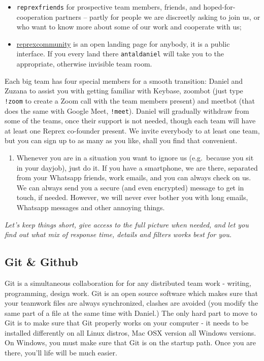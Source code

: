 \documentclass[
  a4paper,
  openany, a4paper, oneside]{book}
\providecommand{\tightlist}{%
  \setlength{\itemsep}{0pt}\setlength{\parskip}{0pt}}
\begin{document}
\begin{itemize}
\tightlist
\item
  \texttt{reprexfriends} for prospective team members, friends, and hoped-for-cooperation partners -- partly for people we are discreetly asking to join us, or who want to know more about some of our work and cooperate with us;
\item
  \href{https://keybase.io/team/reprexcommunity}{reprexcommunity} is an open landing page for anybody, it is a public interface. If you every land there \texttt{antaldaniel} will take you to the appropriate, otherwise invisible team room.
\end{itemize}

Each big team has four special members for a smooth transition: Daniel and Zuzana to assist you with getting familiar with Keybase, zoombot (just type \texttt{!zoom} to create a Zoom call with the team members present) and meetbot (that does the same with Google Meet, \texttt{!meet}). Daniel will gradually withdraw from some of the teams, once their support is not needed, though each team will have at least one Reprex co-founder present. We invite everybody to at least one team, but you can sign up to as many as you like, shall you find that convenient.

\begin{enumerate}
\def\labelenumi{\arabic{enumi}.}
\setcounter{enumi}{8}
\tightlist
\item
  Whenever you are in a situation you want to ignore us (e.g.~because you sit in your dayjob), just do it. If you have a smartphone, we are there, separated from your Whatsapp friends, work emails, and you can always check on us. We can always send you a secure (and even encrypted) message to get in touch, if needed. However, we will never ever bother you with long emails, Whatsapp messages and other annoying things.
\end{enumerate}

\emph{Let's keep things short, give access to the full picture when needed, and let you find out what mix of response time, details and filters works best for you.}

\hypertarget{github}{%
\subsection{Git \& Github}\label{github}}

Git is a simultaneous collaboration for for any distributed team work - writing, programming, design work. Git is an open source software which makes sure that your teamwork files are always synchronized, clashes are avoided (you modify the same part of a file at the same time with Daniel.) The only hard part to move to Git is to make sure that Git properly works on your computer - it needs to be installed differently on all Linux distros, Mac OSX version all Windows versions. On Windows, you must make sure that Git is on the startup path. Once you are there, you'll life will be much easier.
\end{document}
